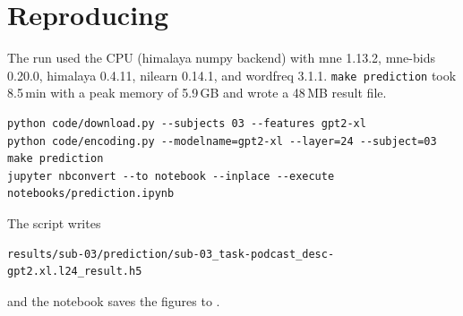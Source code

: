 \documentclass[11pt]{article}
\begin{document}
\section{Reproducing}

The run used the CPU (himalaya numpy backend) with mne 1.13.2, mne-bids 0.20.0, himalaya 0.4.11, nilearn 0.14.1, and wordfreq 3.1.1. \texttt{make prediction} took 8.5\,min with a peak memory of 5.9\,GB and wrote a 48\,MB result file.

\begin{verbatim}
python code/download.py --subjects 03 --features gpt2-xl
python code/encoding.py --modelname=gpt2-xl --layer=24 --subject=03
make prediction
jupyter nbconvert --to notebook --inplace --execute notebooks/prediction.ipynb
\end{verbatim}

\noindent The script writes
\begin{verbatim}
results/sub-03/prediction/sub-03_task-podcast_desc-gpt2.xl.l24_result.h5
\end{verbatim}
and the notebook saves the figures to .
\end{document}
